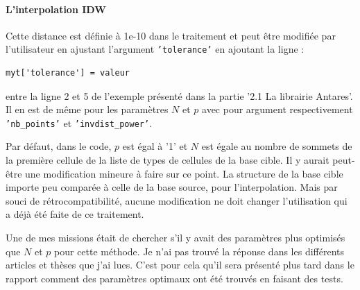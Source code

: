 \label{implementation_IDW}\paragraph{L'interpolation IDW}

Cette distance est définie à 1e-10 dans le traitement et peut être modifiée par l'utilisateur en ajustant l'argument \texttt{'tolerance'} en ajoutant la ligne :
\begin{lstlisting}[]
    myt['tolerance'] = valeur
\end{lstlisting}
entre la ligne 2 et 5 de l'exemple présenté dans la partie '2.1 La librairie Antares'.
Il en est de même pour les paramètres \(N\) et \(p\) avec pour argument respectivement \texttt{'nb\_points'} et \texttt{'invdist\_power'}.\label{parametres}

Par défaut, dans le code, \(p\) est égal à '1' et \(N\) est égale au nombre de sommets de la première cellule de la liste de types de cellules de la base cible. Il y aurait peut-être une modification mineure à faire sur ce point. La structure de la base cible importe peu comparée à celle de la base source, pour l'interpolation. Mais par souci de rétrocompatibilité, aucune modification ne doit changer l'utilisation qui a déjà été faite de ce traitement. %


Une de mes missions était de chercher s'il y avait des paramètres plus optimisés que \(N\) et \(p\) pour cette méthode. Je n'ai pas trouvé la réponse dans les différents articles \cite{idw-arcgis} et thèses que j'ai lues. C'est pour cela qu'il sera présenté plus tard dans le rapport comment des paramètres optimaux ont été trouvés en faisant des tests.


